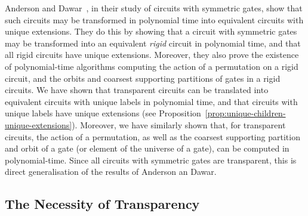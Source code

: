 \documentclass[../paper.tex]{subfiles}
\begin{document}
Anderson and Dawar~\cite{AndersonD17}, in their study of circuits with symmetric
gates, show that such circuits may be transformed in polynomial time into
equivalent circuits with unique extensions. They do this by showing that a
circuit with symmetric gates may be transformed into an equivalent \emph{rigid}
circuit in polynomial time, and that all rigid circuits have unique extensions.
Moreover, they also prove the existence of polynomial-time algorithms computing
the action of a permutation on a rigid circuit, and the orbits and coarsest
supporting partitions of gates in a rigid circuits. We have shown that
transparent circuits can be translated into equivalent circuits with unique
labels in polynomial time, and that circuits with unique labels have unique
extensions (see Proposition~\ref{prop:unique-children-unique-extensions}). Moreover, we have similarly shown that, for
transparent circuits, the action of a permutation, as well as the coarsest
supporting partition and orbit of a gate (or element of the universe of a gate),
can be computed in polynomial-time. Since all circuits with symmetric gates are
transparent, this is direct generalisation of the results of Anderson an Dawar.

\subsection{The Necessity of Transparency}


\end{document}

